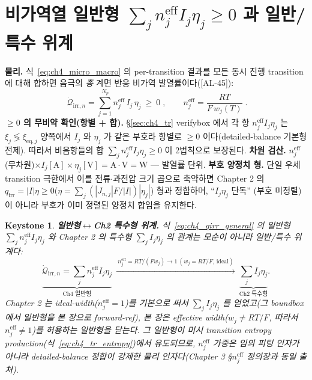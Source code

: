 \documentclass[11pt,a4paper]{article}
\newtheorem*{keybox}{Keystone}
\newcommand{\eff}{\mathrm{eff}}
\newcommand{\eq}{\mathrm{eq}}
\newcommand{\irr}{\mathrm{irr}}
\newcommand{\AL}[1]{\textsf{[AL-#1]}}
\begin{document}
\section{비가역열 일반형 $\sum_j n_j^{\eff}I_j\eta_j\ge0$ 과 일반/특수 위계}\label{sec:ch4_general}
\textbf{물리.} 식~\eqref{eq:ch4_micro_macro} 의 per-transition 결과를 모든 동시 진행 transition 에 대해 합하면
음극의 \emph{총} 계면 반응 비가역 발열률이다(\AL{45}):
\begin{equation}
\boxed{\;\dot{\mathcal Q}_{\irr,n}=\sum_{j=1}^{N_p} n_j^{\eff}\,I_j\,\eta_j\ \ge\ 0\;,\qquad
n_j^{\eff}=\frac{RT}{F\,w_j(T)}\;.}
\label{eq:ch4_qirr_general}
\end{equation}
\textbf{$\ge0$ 의 무비약 확인(항별 + 합).} \S\ref{sec:ch4_tr} verifybox 에서 각 항 $n_j^{\eff}I_j\eta_j$ 는
$\xi_j\lessgtr\xi_{\eq,j}$ 양쪽에서 $I_j$ 와 $\eta_j$ 가 같은 부호라 항별로 $\ge0$ 이다(detailed-balance
기본형 전제). 따라서 비음항들의 합 $\sum_j n_j^{\eff}I_j\eta_j\ge0$ 이 2법칙으로 보장된다. \textbf{차원 검산.}
$n_j^{\eff}$(무차원)$\times I_j[\mathrm A]\times\eta_j[\mathrm V]=\mathrm{A\cdot V}=\mathrm W$ — 발열률 단위.
\textbf{부호 양정치 형.} 단일 우세 transition 극한에서 이를 전류$\cdot$과전압 크기 곱으로 축약하면
Chapter 2 의 $q_\irr=|I|\eta\ge0$($\eta=\sum_j(|J_{n,j}|F/|I|)|\eta_j|$) 형과 정합하며, ``$I_j\eta_j$ 단독''
(부호 미정렬)이 아니라 부호가 이미 정렬된 양정치 합임을 유지한다.

\begin{keybox}
\textbf{일반형$\leftrightarrow$Ch2 특수형 위계.} 식~\eqref{eq:ch4_qirr_general} 의 \emph{일반형}
$\sum_j n_j^{\eff}I_j\eta_j$ 와 Chapter 2 의 \emph{특수형} $\sum_j I_j\eta_j$ 의 관계는 \emph{모순이 아니라
일반/특수 위계}다:
\begin{equation}
\underbrace{\dot{\mathcal Q}_{\irr,n}=\sum_j n_j^{\eff}I_j\eta_j}_{\text{Ch4 일반형}}
\ \xrightarrow{\ n_j^{\eff}=RT/(Fw_j)\to1\ (w_j=RT/F,\ \text{ideal})\ }\
\underbrace{\sum_j I_j\eta_j}_{\text{Ch2 특수형}}.
\label{eq:ch4_hierarchy}
\end{equation}
Chapter 2 는 ideal-width($n_j^{\eff}=1$)를 기본으로 써서 $\sum_j I_j\eta_j$ 를 얻었고(그 boundbox 에서 일반형을
본 장으로 forward-ref), 본 장은 effective width($w_j\ne RT/F$, 따라서 $n_j^{\eff}\ne1$)를 허용하는 일반형을
닫는다. 그 일반형이 미시 transition entropy production(식~\eqref{eq:ch4_tr_entropy})에서 유도되므로, $n_j^{\eff}$
가중은 임의 피팅 인자가 아니라 \emph{detailed-balance 정합이 강제한} 물리 인자다(Chapter 3 \S$n_j^{\eff}$
정의장과 동일 출처).
\end{keybox}
\end{document}
